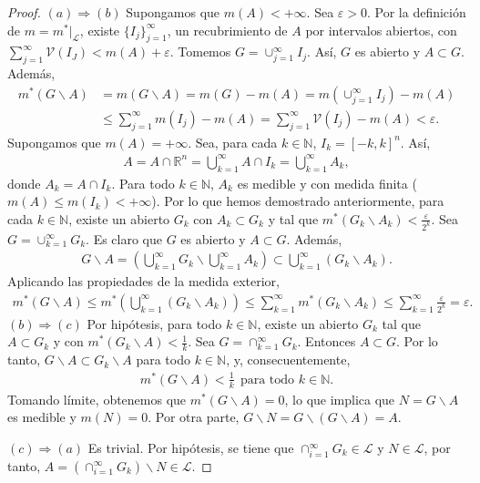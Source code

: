 \begin{proof}
    $(a) \Longrightarrow (b)$ Supongamos que $m(A) < +\infty$. Sea $\varepsilon > 0$. Por la definición de $m = m^*|_{\mathcal{L}}$, existe $\{I_j\}_{j=1}^{\infty}$, un recubrimiento de $A$ por intervalos abiertos, con $\sum_{j=1}^{\infty}{\mathcal{V}(I_J)} < m(A) + \varepsilon$. Tomemos $G = \cup_{j=1}^{\infty}{I_j}$. Así, $G$ es abierto y $A \subset G$. Además,
    \begin{align*}
        m^*(G \backslash A) & = m(G \backslash A) = m(G) - m(A) = m(\cup_{j=1}^{\infty}{I_j}) -  m(A)                               \\
                            & \leq \sum_{j=1}^{\infty}{m(I_j)} - m(A) = \sum_{j=1}^{\infty}{\mathcal{V}(I_j)} - m(A) < \varepsilon.
    \end{align*}
    Supongamos que $m(A) = +\infty$. Sea, para cada $k \in \mathbb{N}$, $I_k = [-k,k]^n$. Así,
    \begin{align*}
        A = A \cap \mathbb{R}^n = \bigcup_{k=1}^{\infty}{A \cap I_k} = \bigcup_{k=1}^{\infty}{A_k},
    \end{align*}
    donde $A_k = A \cap I_k$. Para todo $k \in \mathbb{N}$, $A_k$ es medible y con medida finita ($m(A) \leq m(I_k) < +\infty$). Por lo que hemos demostrado anteriormente, para cada $k \in \mathbb{N}$, existe un abierto $G_k$ con $A_k \subset G_k$ y tal que $m^*(G_k \backslash A_k) < \frac{\varepsilon}{2^k}$. Sea $G = \cup_{k=1}^{\infty}{G_k}$. Es claro que $G$ es abierto y $A \subset G$. Además,
    \begin{align*}
        G \backslash A = \left( \bigcup_{k=1}^{\infty}{G_k} \backslash \bigcup_{k=1}^{\infty}{A_k} \right) \subset \bigcup_{k=1}^{\infty}{(G_k \backslash A_k)}.
    \end{align*}
    Aplicando las propiedades de la medida exterior,
    \begin{align*}
        m^*(G \backslash A) \leq m^*\left(  \bigcup_{k=1}^{\infty}{(G_k \backslash A_k)} \right) \leq \sum_{k=1}^{\infty}{m^*(G_k \backslash A_k)} \leq \sum_{k=1}^{\infty}{\frac{\varepsilon}{2^k}} = \varepsilon.
    \end{align*}
    $(b) \Longrightarrow (c)$ Por hipótesis, para todo $k \in \mathbb{N}$, existe un abierto $G_k$ tal que $A \subset G_k$ y con $m^*(G_k \backslash A) < \frac{1}{k}$. Sea $G = \cap_{k=1}^{\infty}{G_k}$. Entonces $A \subset G$. Por lo tanto, $G \backslash A \subset G_k \backslash A$ para todo $k \in \mathbb{N}$, y, consecuentemente,
    \begin{align*}
        m^*(G \backslash A) < \frac{1}{k} \ \ \text{para todo } k \in \mathbb{N}.
    \end{align*}
    Tomando límite, obtenemos que $m^*(G \backslash A) = 0$, lo que implica que $N = G \backslash A$ es medible y $m(N) = 0$. Por otra parte, $G \backslash N = G \backslash (G \backslash A) = A$.

    $(c) \Longrightarrow (a)$ Es trivial. Por hipótesis, se tiene que $\cap_{i=1}^{\infty}{G_k} \in \mathcal{L}$ y $N \in \mathcal{L}$, por tanto, $A = (\cap_{i=1}^{\infty}{G_k}) \backslash N \in \mathcal{L}$.
\end{proof}

